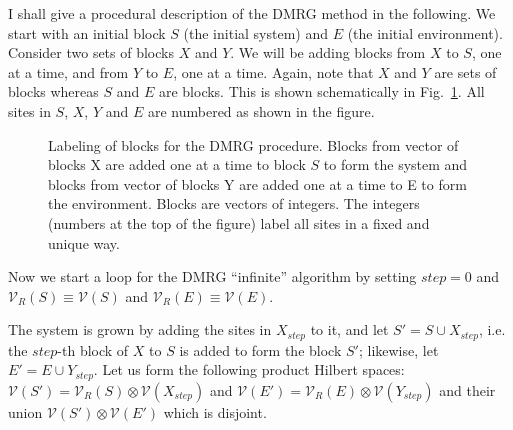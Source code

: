 \documentclass[paper=letter]{scrartcl}
\begin{document}
I shall give a procedural description of the DMRG method in the following. We start with an initial block $S$ (the initial system) and $E$ (the initial environment). Consider two sets of blocks $X$ and $Y$. We will be adding blocks from $X$ to $S$, one at a time, and from $Y$ to $E$, one at a time. Again, note that $X$ and $Y$ are sets of blocks whereas $S$ and $E$ are blocks. This is shown schematically in Fig.~\ref{fig:sxye}. All sites in $S$, $X$, $Y$ and $E$ are numbered as shown in the figure. \begin{figure}  \caption{Labeling of blocks for the DMRG procedure. Blocks from vector of blocks X are added one at a time to block $S$ to form the system and blocks from vector of blocks Y are added one at a time to E to form the environment. Blocks are vectors of integers. The integers (numbers at the top of the figure) label all sites in a fixed and unique way.\label{fig:sxye}} \end{figure}

Now we start a loop for the DMRG ``infinite'' algorithm by setting $step=0$ and $\mathcal{V}_R(S)\equiv\mathcal{V}(S)$ and $\mathcal{V}_R(E)\equiv\mathcal{V}(E)$.

The system is grown by adding the sites in $X_{step}$ to it, and let $S'=S\cup X_{step}$, i.e. the $step$-th block of $X$ to $S$ is added to form the block $S'$; likewise, let $E'=E\cup Y_{step}$. Let us form the following product Hilbert spaces: $\mathcal{V}(S')=\mathcal{V}_R(S)\otimes \mathcal{V}(X_{step})$ and $\mathcal{V}(E')=\mathcal{V}_R(E)\otimes \mathcal{V}(Y_{step})$ and their union $\mathcal{V}(S')\otimes\mathcal{V}(E')$ which is disjoint.
\end{document}
